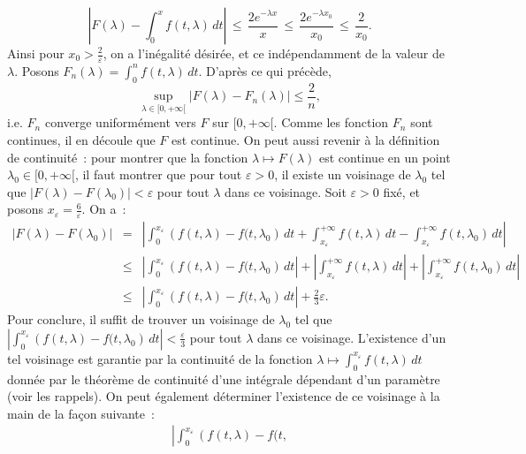 {\begin{enumerate}
{\begin{equation*}
\left|F(\lambda) - \int_{0}^{x} f(t, \lambda)\,dt \right| \,\leq\,
\frac{2 e^{-\lambda x}}{x} \,\leq\, \frac{2 e^{-\lambda
x_{0}}}{x_{0}} \,\leq\, \frac{2}{x_{0}}.
\end{equation*}
Ainsi pour $x_{0} > \frac{2}{\varepsilon}$, on a l'in\'egalit\'e
d\'esir\'ee, et ce ind\'ependamment de la valeur de $\lambda$.
Posons $F_{n}(\lambda) = \int_{0}^{n}f(t, \lambda) \,dt$.
D'apr\`es ce qui pr\'ec\`ede,
$$
\sup_{\lambda\in [0,+\infty[} |F(\lambda) - F_{n}(\lambda)| \leq
\frac{2}{n},
$$
i.e. $F_{n}$ converge uniform\'ement vers $F$ sur $[0, +\infty[$.
Comme les fonction $F_{n}$ sont continues, il en d\'ecoule que $F$
est continue. On peut aussi revenir \`a la d\'efinition de
continuit\'e~:
 pour montrer que la fonction $\lambda \mapsto F(\lambda)$
est continue en un point $\lambda_{0} \in [0, +\infty[$, il faut
montrer que pour tout $\varepsilon>0$, il existe un voisinage de
${\lambda}_{0}$ tel que $|F(\lambda) - F({\lambda}_{0})| <
\varepsilon$ pour tout $\lambda $ dans ce voisinage. Soit
$\varepsilon>0$ fix\'e, et posons $x_{\varepsilon} =
\frac{6}{\varepsilon}$. On a~:
\begin{eqnarray*}
|F(\lambda) - F({\lambda}_{0})| &=&
\left|\int_{0}^{x_{\varepsilon}} \left(f(t, \lambda) - f(t,
{\lambda}_{0}\right)\,dt + \int_{x_{\varepsilon}}^{+\infty} f(t,
\lambda)\, dt - \int_{x_{\varepsilon}}^{+\infty} f(t,
{\lambda}_{0})\,dt
\right|\\
&\leq & \left|\int_{0}^{x_{\varepsilon}} \left(f(t, \lambda) -
f(t, {\lambda}_{0}\right)\,dt\right| + \left|
\int_{x_{\varepsilon}}^{+\infty} f(t, \lambda)\, dt \right| +
\left| \int_{x_{\varepsilon}}^{+\infty} f(t,
{\lambda}_{0})\,dt \right|\\
& \leq & \left|\int_{0}^{x_{\varepsilon}} \left(f(t, \lambda) -
f(t, {\lambda}_{0}\right)\,dt \right|+ \frac{2}{3}\varepsilon.
\end{eqnarray*}
Pour conclure, il suffit de trouver un voisinage de ${\lambda}_0$
tel que  $\left|\int_{0}^{x_{\varepsilon}} \left(f(t, \lambda) -
f(t, {\lambda}_{0}\right)\,dt\right| < \frac{\varepsilon}{3}$ pour
tout $\lambda $ dans ce voisinage. L'existence d'un tel voisinage
est garantie par la continuit\'e de la fonction $\lambda \mapsto
\int_{0}^{x_{\varepsilon}}f(t, \lambda)\,dt$ donn\'ee par le
th\'eor\`eme de continuit\'e d'une int\'egrale d\'ependant d'un param\`etre (voir les rappels).
On peut \'egalement d\'eterminer
l'existence de ce voisinage \`a la main de la fa\c{c}on suivante~:
\begin{eqnarray*}
\left|\int_{0}^{x_{\varepsilon}} \left(f(t, \lambda) - f(t,

\end{eqnarray*}}
\end{enumerate}}
